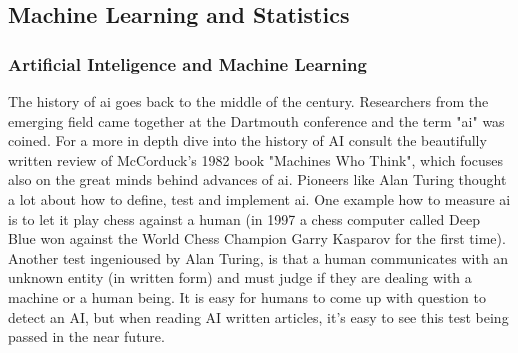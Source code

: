 

\subsection{Machine Learning and Statistics}
\subsubsection{Artificial Inteligence and Machine Learning}

The history of \gls{ai} goes back to the middle of the  century. 
Researchers from the emerging field came together at the Dartmouth conference and the term "\gls{ai}" was coined\cite{McCarthy1955}. 
For a more in depth dive into the history of AI consult the beautifully written review\cite{Apter1982} of McCorduck's 1982 book "Machines Who Think"\cite{McCorduck1982}, which focuses also on the great minds behind advances of \gls{ai}.
Pioneers like Alan Turing thought a lot about how to define, test and implement \gls{ai}\cite{Howard2019}. 
One example how to measure \gls{ai} is to let it play chess against a human\cite{Silver2017} 
(in 1997 a chess computer called Deep Blue won against the World Chess Champion Garry Kasparov for the first time\cite{Feng1999}).
Another test ingenioused by Alan Turing, is that a human communicates with an unknown entity (in written form) and must judge if they are dealing with a machine or a human being. 
It is easy for humans to come up with question to detect an AI, 
but when reading AI written articles\cite{gpt2020}, it's easy to see this test being passed in the near future. 


